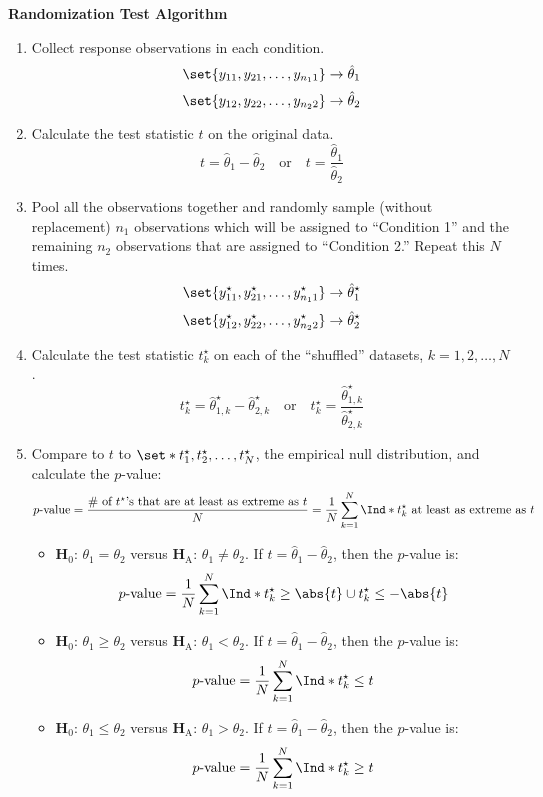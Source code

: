 \begin{framed}
      \textbf{Randomization Test Algorithm}
      \begin{enumerate}
            \item Collect response observations in each condition.
                  \[ \set{y_{11},y_{21},\ldots,y_{n_1 1}}\to \hat{\theta}_1 \]
                  \[ \set{y_{12},y_{22},\ldots,y_{n_2 2}}\to \hat{\theta}_2 \]
            \item Calculate the test statistic $ t $ on the original data.
                  \[ t=\hat{\theta}_1-\hat{\theta}_2\quad\text{or}\quad t=\frac{\hat{\theta}_1}{\hat{\theta}_2} \]
            \item Pool all the observations together and randomly sample (without replacement)
                  $ n_1 $ observations which will be assigned to ``Condition 1'' and the remaining $ n_2 $
                  observations that are assigned to ``Condition 2.'' Repeat this $ N $ times.
                  \[ \set{y_{11}^\star,y_{21}^\star,\ldots,y_{n_1 1}^\star}\to \hat{\theta}_1^\star \]
                  \[ \set{y_{12}^\star,y_{22}^\star,\ldots,y_{n_2 2}^\star}\to \hat{\theta}_2^\star \]
            \item Calculate the test statistic $ t_k^\star $ on each of the ``shuffled'' datasets, $ k=1,2,\ldots,N $.
                  \[ t_k^\star=\hat{\theta}_{1,k}^\star-\hat{\theta}_{2,k}^\star\quad\text{or}\quad t_k^\star=\frac{\hat{\theta}_{1,k}^\star}{\hat{\theta}_{2,k}^\star}  \]
            \item Compare to $ t $ to $ \set*{t_1^\star,t_2^\star,\ldots,t_N^\star} $, the empirical
                  null distribution, and calculate the $ p $-value:
                  \[ p\text{-value}=\frac{\text{\# of $t^\star$'s that are at least as extreme as $t$}}{N}=\frac{1}{N} \sum_{k=1}^{N} \Ind*{t_k^\star\text{ at least as extreme as $t$}}  \]
                  \begin{itemize}
                        \item $ \mathbf{H}_0 $: $ \theta_1=\theta_2 $ versus $ \mathbf{H}_\text{A} $: $ \theta_1\ne \theta_2 $. If $ t=\hat{\theta}_1-\hat{\theta}_2 $, then
                              the $ p $-value is:
                              \[ p\text{-value}=\frac{1}{N} \sum_{k=1}^{N} \Ind*{t_k^\star\ge \abs{t}\cup t_k^\star\le -\abs{t}} \]
                        \item $ \mathbf{H}_0 $: $ \theta_1\ge \theta_2 $ versus $ \mathbf{H}_\text{A} $: $ \theta_1<\theta_2 $. If $ t=\hat{\theta}_1-\hat{\theta}_2 $, then
                              the $ p $-value is:
                              \[ p\text{-value}=\frac{1}{N} \sum_{k=1}^{N} \Ind*{t_k^\star\le t} \]
                        \item $ \mathbf{H}_0 $: $ \theta_1\le \theta_2 $ versus $ \mathbf{H}_\text{A} $: $ \theta_1>\theta_2 $. If $ t=\hat{\theta}_1-\hat{\theta}_2 $, then
                              the $ p $-value is:
                              \[ p\text{-value}=\frac{1}{N} \sum_{k=1}^{N} \Ind*{t_k^\star\ge t} \]
                  \end{itemize}
      \end{enumerate}
\end{framed}
